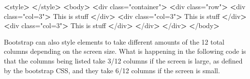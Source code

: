 \documentclass[]{book}
\newenvironment{Shaded}{\begin{snugshade}}{\end{snugshade}}
\newcommand{\StringTok}[1]{\textcolor[rgb]{0.31,0.60,0.02}{#1}}
\newcommand{\OperatorTok}[1]{\textcolor[rgb]{0.81,0.36,0.00}{\textbf{#1}}}
\newcommand{\ExtensionTok}[1]{#1}
\newcommand{\NormalTok}[1]{#1}
\begin{document}
\begin{Shaded}
\begin{Highlighting}[]
\OperatorTok{<}\ExtensionTok{style}\OperatorTok{>}
\OperatorTok{<}\NormalTok{/}\ExtensionTok{style}\OperatorTok{>}
\OperatorTok{<}\ExtensionTok{body}\OperatorTok{>}
    \OperatorTok{<}\ExtensionTok{div}\NormalTok{ class=}\StringTok{"container"}\OperatorTok{>}
        \OperatorTok{<}\ExtensionTok{div}\NormalTok{ class=}\StringTok{"row"}\OperatorTok{>}
            \OperatorTok{<}\ExtensionTok{div}\NormalTok{ class=}\StringTok{"col=3"}\OperatorTok{>}
                \ExtensionTok{This}\NormalTok{ is stuff}
            \OperatorTok{<}\NormalTok{/}\ExtensionTok{div}\OperatorTok{>}
            \OperatorTok{<}\ExtensionTok{div}\NormalTok{ class=}\StringTok{"col=3"}\OperatorTok{>}
                \ExtensionTok{This}\NormalTok{ is stuff}
            \OperatorTok{<}\NormalTok{/}\ExtensionTok{div}\OperatorTok{>}
            \OperatorTok{<}\ExtensionTok{div}\NormalTok{ class=}\StringTok{"col=3"}\OperatorTok{>}
                \ExtensionTok{This}\NormalTok{ is stuff}
            \OperatorTok{<}\NormalTok{/}\ExtensionTok{div}\OperatorTok{>}
        \OperatorTok{<}\NormalTok{/}\ExtensionTok{div}\OperatorTok{>}
    \OperatorTok{<}\NormalTok{/}\ExtensionTok{div}\OperatorTok{>}
\OperatorTok{<}\NormalTok{/}\ExtensionTok{body}\OperatorTok{>}
\end{Highlighting}
\end{Shaded}

Bootstrap can also style elements to take different amounts of the 12
total columns depending on the screen size. What is happening in the
following code is that the columns being listed take 3/12 columns if the
screen is large, as defined by the bootstrap CSS, and they take 6/12
columns if the screen is small.
\end{document}
